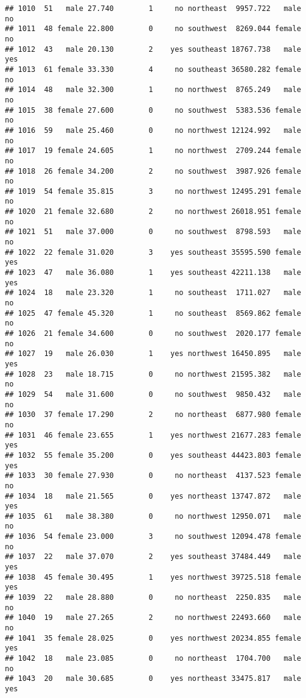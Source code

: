 \documentclass[
]{article}
\begin{document}
\begin{verbatim}
## 1010  51   male 27.740        1     no northeast  9957.722   male       no
## 1011  48 female 22.800        0     no southwest  8269.044 female       no
## 1012  43   male 20.130        2    yes southeast 18767.738   male      yes
## 1013  61 female 33.330        4     no southeast 36580.282 female       no
## 1014  48   male 32.300        1     no northwest  8765.249   male       no
## 1015  38 female 27.600        0     no southwest  5383.536 female       no
## 1016  59   male 25.460        0     no northwest 12124.992   male       no
## 1017  19 female 24.605        1     no northwest  2709.244 female       no
## 1018  26 female 34.200        2     no southwest  3987.926 female       no
## 1019  54 female 35.815        3     no northwest 12495.291 female       no
## 1020  21 female 32.680        2     no northwest 26018.951 female       no
## 1021  51   male 37.000        0     no southwest  8798.593   male       no
## 1022  22 female 31.020        3    yes southeast 35595.590 female      yes
## 1023  47   male 36.080        1    yes southeast 42211.138   male      yes
## 1024  18   male 23.320        1     no southeast  1711.027   male       no
## 1025  47 female 45.320        1     no southeast  8569.862 female       no
## 1026  21 female 34.600        0     no southwest  2020.177 female       no
## 1027  19   male 26.030        1    yes northwest 16450.895   male      yes
## 1028  23   male 18.715        0     no northwest 21595.382   male       no
## 1029  54   male 31.600        0     no southwest  9850.432   male       no
## 1030  37 female 17.290        2     no northeast  6877.980 female       no
## 1031  46 female 23.655        1    yes northwest 21677.283 female      yes
## 1032  55 female 35.200        0    yes southeast 44423.803 female      yes
## 1033  30 female 27.930        0     no northeast  4137.523 female       no
## 1034  18   male 21.565        0    yes northeast 13747.872   male      yes
## 1035  61   male 38.380        0     no northwest 12950.071   male       no
## 1036  54 female 23.000        3     no southwest 12094.478 female       no
## 1037  22   male 37.070        2    yes southeast 37484.449   male      yes
## 1038  45 female 30.495        1    yes northwest 39725.518 female      yes
## 1039  22   male 28.880        0     no northeast  2250.835   male       no
## 1040  19   male 27.265        2     no northwest 22493.660   male       no
## 1041  35 female 28.025        0    yes northwest 20234.855 female      yes
## 1042  18   male 23.085        0     no northeast  1704.700   male       no
## 1043  20   male 30.685        0    yes northeast 33475.817   male      yes

\end{verbatim}
\end{document}
